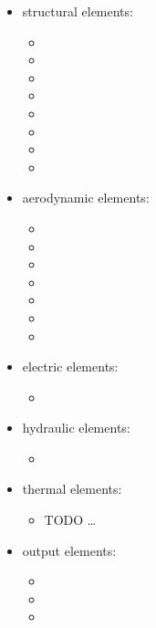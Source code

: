 \begin{itemize}
\item structural elements:
\begin{itemize}
\item {}
\item {}
\item {}
\item {}
\item {}
\item {}
\item {}
\item {}
\end{itemize}

\item aerodynamic elements:
\begin{itemize}
\item {}
\item {}
\item {}
\item {}
\item {}
\item {}
\item {}
\end{itemize}

\item electric elements:
\begin{itemize}
\item {}
\end{itemize}

\item hydraulic elements:
\begin{itemize}
\item {}
\end{itemize}

\item thermal elements:
\begin{itemize}
\item TODO \ldots
\end{itemize}

\item output elements:
\begin{itemize}
\item {}
\item {}
\item {}
\end{itemize}


\end{itemize}

